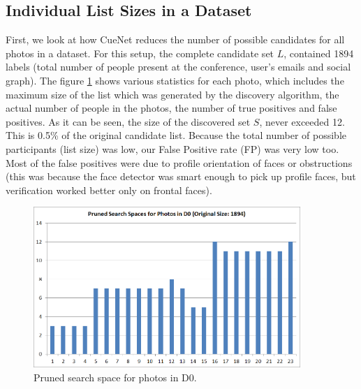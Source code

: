\subsection{Individual List Sizes in a Dataset}
First, we look at how CueNet reduces the number of possible candidates for all photos in a dataset. For this setup, the complete candidate set $L$, contained 1894 labels (total number of people present at the conference, user's emails and social graph). The figure \ref{fig:exp-vldb-all-cx} shows various statistics for each photo, which includes the maximum size of the list which was generated by the discovery algorithm, the actual number of people in the photos, the number of true positives and false positives. As it can be seen, the size of the discovered set $S$, never exceeded 12. This is 0.5\% of the original candidate list. Because the total number of possible participants (list size) was low, our False Positive rate (FP) was very low too. Most of the false positives were due to profile orientation of faces or obstructions (this was because the face detector was smart enough to pick up profile faces, but verification worked better only on frontal faces).

\begin{figure}[t]
\centering
\includegraphics[width=0.9\textwidth]{media/reduced-list-sizes-d0.png}
\caption{Pruned search space for photos in D0.}
\label{fig:exp-vldb-all-cx}
\end{figure}

